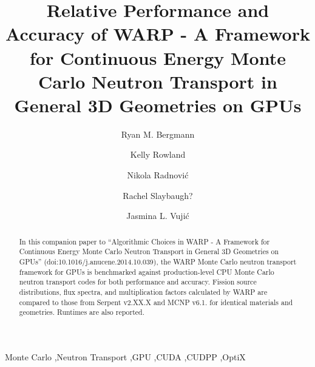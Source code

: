 \documentclass[preprint,12pt]{elsarticle}
\begin{document}
\begin{frontmatter}



\title{Relative Performance and Accuracy of WARP - A Framework for Continuous Energy Monte Carlo Neutron Transport in General 3D Geometries on GPUs}


\author{Ryan M. Bergmann }

\author{Kelly Rowland }

\author{Nikola Radnovi\'c }

\author{Rachel Slaybaugh?}

\author{Jasmina L. Vuji\'c }


\address{Department of Nuclear Engineering, 
4155 Etcheverry Hall, 
University of California - Berkeley,
Berkeley, CA 94703-1730}

\begin{abstract}

In this companion paper to ``Algorithmic Choices in WARP - A Framework for Continuous Energy Monte Carlo Neutron Transport in General 3D Geometries on GPUs'' (doi:10.1016/j.anucene.2014.10.039), the WARP Monte Carlo neutron transport framework for GPUs is benchmarked against production-level CPU Monte Carlo neutron transport codes for both performance and accuracy.  Fission source distributions, flux spectra, and multiplication factors calculated by WARP are compared to those from Serpent v2.XX.X and MCNP v6.1. for identical materials and geometries.  Runtimes are also reported.

\end{abstract}

\begin{keyword}
Monte Carlo \sep Neutron Transport \sep GPU \sep CUDA \sep CUDPP \sep OptiX


\end{keyword}

\end{frontmatter}
\end{document}
